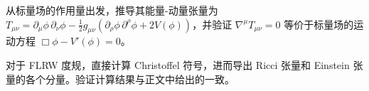 \begin{exercise}
从标量场的作用量出发，推导其能量-动量张量为 $T_{\mu\nu} = \partial_\mu\phi\,\partial_\nu\phi - \frac{1}{2}g_{\mu\nu}(\partial_\rho\phi\,\partial^\rho\phi + 2V(\phi))$，并验证 $\nabla^\mu T_{\mu\nu} = 0$ 等价于标量场的运动方程 $\Box\phi - V'(\phi) = 0$。
\end{exercise}

\begin{exercise}
对于 FLRW 度规，直接计算 Christoffel 符号，进而导出 Ricci 张量和 Einstein 张量的各个分量。验证计算结果与正文中给出的一致。
\end{exercise}
